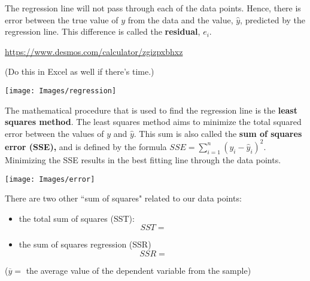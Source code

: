 \documentclass[12pt, letterpaper]{article}
\newcounter{visualconnection}
\theoremstyle{definition}
\begin{document}
\begin{defn}
The regression line will not pass through each of the data points.  Hence, there is error between the true value of $y$ from the data and the value, $\hat{y}$, predicted by the regression line.  This difference is called the \textbf{residual}, $e_i$.
\end{defn}

\begin{visualconnection}
\begin{center}
\vspace*{.15in}
\href{https://www.desmos.com/calculator/zgizpxbhxz}{https://www.desmos.com/calculator/zgizpxbhxz}

\end{center}

(Do this in Excel as well if there's time.)
\end{visualconnection}

\newpage


\begin{center}
\texttt{[image: Images/regression]}
\end{center}

\vfill

\begin{statement}
\vfill
The mathematical procedure that is used to find the regression line is the \textbf{least squares method}.  The least squares method aims to minimize the total squared error between the values of $y$ and $\hat{y}$.  This sum is also called the \textbf{sum of squares error (SSE),} and is defined by the formula $SSE = \sum_{i=1}^n (y_i-\hat{y}_i)^2$.  Minimizing the SSE results in the best fitting line through the data points.

\vspace*{1in}

\begin{center}
\texttt{[image: Images/error]}
\end{center}

\vfill

\end{statement}

\newpage

\begin{defn}
There are two other ``sum of squares" related to our data points:
\begin{itemize}

\item the total sum of squares (SST):
$$ SST = ~~~~~~~~~~ $$

\item the sum of squares regression (SSR)
$$ SSR = ~~~~~~~~~~ $$

\end{itemize}
($\overline{y}=$ the average value of the dependent variable from the sample)
\end{defn}
\end{document}
